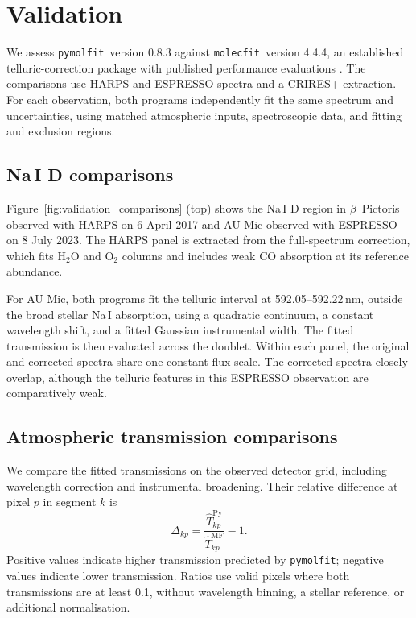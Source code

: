 \documentclass{aa}
\newcommand{\molecfit}{{\texttt{molecfit}}}
\newcommand{\pymolfit}{\texttt{pymolfit}}
\begin{document}

\section{Validation}\label{sec:validation}

We assess \pymolfit\ version 0.8.3 against \molecfit\ version 4.4.4, an established telluric-correction package with published performance evaluations \citep{MOLECFIT1,MOLECFIT2}. The comparisons use HARPS and ESPRESSO spectra and a CRIRES+ extraction. For each observation, both programs independently fit the same spectrum and uncertainties, using matched atmospheric inputs, spectroscopic data, and fitting and exclusion regions.

\subsection{Na\,I D comparisons}

Figure~\ref{fig:validation_comparisons} (top) shows the Na\,I D region in $\beta$~Pictoris observed with HARPS on 6 April 2017 and AU Mic observed with ESPRESSO on 8 July 2023. The HARPS panel is extracted from the full-spectrum correction, which fits H$_2$O and O$_2$ columns and includes weak CO absorption at its reference abundance.

For AU Mic, both programs fit the telluric interval at 592.05--592.22\,nm, outside the broad stellar Na\,I absorption, using a quadratic continuum, a constant wavelength shift, and a fitted Gaussian instrumental width. The fitted transmission is then evaluated across the doublet. Within each panel, the original and corrected spectra share one constant flux scale. The corrected spectra closely overlap, although the telluric features in this ESPRESSO observation are comparatively weak.

\subsection{Atmospheric transmission comparisons}

We compare the fitted transmissions on the observed detector grid, including wavelength correction and instrumental broadening. Their relative difference at pixel $p$ in segment $k$ is
\begin{equation}
    \Delta_{kp}
    = \frac{\widehat T^{\mathrm{Py}}_{kp}}
           {\widehat T^{\mathrm{MF}}_{kp}} - 1.
\end{equation}
Positive values indicate higher transmission predicted by \pymolfit; negative values indicate lower transmission. Ratios use valid pixels where both transmissions are at least 0.1, without wavelength binning, a stellar reference, or additional normalisation.
\end{document}
